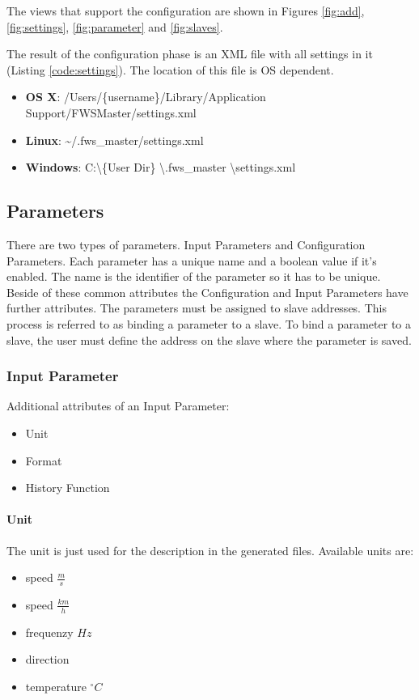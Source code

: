 The views that support the configuration are shown in Figures \ref{fig:add}, \ref{fig:settings}, \ref{fig:parameter} and \ref{fig:slaves}.

The result of the configuration phase is an XML file with all settings in it (Listing \ref{code:settings}). The location of this file is OS dependent. 
\begin{itemize}
    \item \textbf{OS X}: /Users/\{username\}/Library/Application Support/FWSMaster/settings.xml
    \item \textbf{Linux}: \textasciitilde /.fws\_master/settings.xml
    \item \textbf{Windows}: C:\textbackslash \{User Dir\} \textbackslash .fws\_master \textbackslash settings.xml
\end{itemize}

{\C  }

\subsection{Parameters} %
\label{sub:parameters}
There are two types of parameters. Input Parameters and Configuration Parameters. Each parameter has a unique name and a boolean value if it's enabled. The name is the identifier of the parameter so it has to be unique. Beside of these common attributes the Configuration and Input Parameters have further attributes. The parameters must be assigned to slave addresses. This process is referred to as binding a parameter to a slave. To bind a parameter to a slave, the user must define the address on the slave where the parameter is saved.

\subsubsection{Input Parameter} %
\label{ssub:input_parameter}
Additional attributes of an Input Parameter:
\begin{itemize}
	\item Unit
	\item Format
	\item History Function
\end{itemize}

\paragraph{Unit} %
\label{par:unit}
The unit is just used for the description in the generated files. Available units are:
\begin{itemize}
	\item speed $\frac{m}{s}$
	\item speed $\frac{km}{h}$
	\item frequenzy $Hz$
	\item direction
	\item temperature $^\circ C$
\end{itemize}

